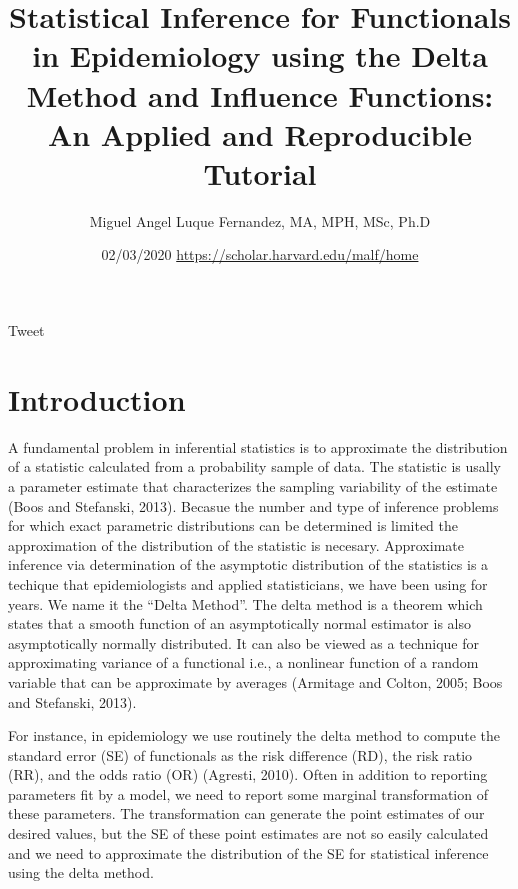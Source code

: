 \documentclass[
]{article}
\title{Statistical Inference for Functionals in Epidemiology using the Delta
Method and Influence Functions: An Applied and Reproducible Tutorial}
\author{Miguel Angel Luque Fernandez, MA, MPH, MSc, Ph.D}
\date{02/03/2020 \url{https://scholar.harvard.edu/malf/home}}
\begin{document}
\maketitle

{
\setcounter{tocdepth}{2}
\tableofcontents
}
Tweet

\hypertarget{introduction}{%
\section{Introduction}\label{introduction}}

A fundamental problem in inferential statistics is to approximate the
distribution of a statistic calculated from a probability sample of
data. The statistic is usally a parameter estimate that characterizes
the sampling variability of the estimate (Boos and Stefanski, 2013).
Becasue the number and type of inference problems for which exact
parametric distributions can be determined is limited the approximation
of the distribution of the statistic is necesary. Approximate inference
via determination of the asymptotic distribution of the statistics is a
techique that epidemiologists and applied statisticians, we have been
using for years. We name it the ``Delta Method''. The delta method is a
theorem which states that a smooth function of an asymptotically normal
estimator is also asymptotically normally distributed. It can also be
viewed as a technique for approximating variance of a functional i.e., a
nonlinear function of a random variable that can be approximate by
averages (Armitage and Colton, 2005; Boos and Stefanski, 2013).

For instance, in epidemiology we use routinely the delta method to
compute the standard error (SE) of functionals as the risk difference
(RD), the risk ratio (RR), and the odds ratio (OR) (Agresti, 2010).
Often in addition to reporting parameters fit by a model, we need to
report some marginal transformation of these parameters. The
transformation can generate the point estimates of our desired values,
but the SE of these point estimates are not so easily calculated and we
need to approximate the distribution of the SE for statistical inference
using the delta method.
\end{document}
